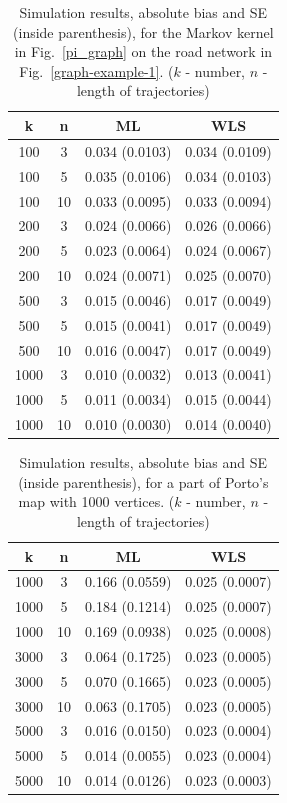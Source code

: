 \documentclass[b5paper,12pt]{report}
\theoremstyle{definition}
\begin{document}
\begin{table}[!b]
\centering
\caption{Simulation results, absolute bias and SE (inside parenthesis), for the Markov kernel in Fig.~\ref{pi_graph} on the road network in Fig.~\ref{graph-example-1}. ($k$ - number, $n$ - length of trajectories)}
\label{simulation_small} 
\begin{tabular}{c c | c c}
k & n & ML & WLS  \\ \hline
100 & 3 & 0.034 (0.0103) & 0.034 (0.0109)\\ 
100 & 5 & 0.035 (0.0106) & 0.034 (0.0103)\\ 
100 & 10 & 0.033 (0.0095) & 0.033 (0.0094)\\ 
200 & 3 & 0.024 (0.0066) & 0.026 (0.0066)\\ 
200 & 5 & 0.023 (0.0064) & 0.024 (0.0067)\\ 
200 & 10 & 0.024 (0.0071) & 0.025 (0.0070)\\ 
500 & 3 & 0.015 (0.0046) & 0.017 (0.0049)\\
500 & 5 & 0.015 (0.0041) & 0.017 (0.0049)\\
500 & 10 & 0.016 (0.0047) & 0.017 (0.0049)\\
1000 & 3 & 0.010 (0.0032) & 0.013 (0.0041)\\
1000 & 5 & 0.011 (0.0034) & 0.015 (0.0044)\\
1000 & 10 & 0.010 (0.0030) & 0.014 (0.0040)
\\
\hline
\end{tabular}
\end{table}

\begin{table}[!h]
\centering
\caption{Simulation results, absolute bias and SE (inside parenthesis), for a part of Porto's map with 1000 vertices. ($k$ - number, $n$ - length of trajectories)}
\label{simulation_large} 
\begin{tabular}{c c | c c}
k & n & ML & WLS  \\ \hline
1000 & 3 & 0.166 (0.0559) & 0.025 (0.0007) \\
1000 & 5 & 0.184 (0.1214) & 0.025 (0.0007) \\
1000 & 10 & 0.169 (0.0938) & 0.025 (0.0008) \\
3000 & 3 & 0.064 (0.1725) & 0.023 (0.0005) \\
3000 & 5 & 0.070 (0.1665) & 0.023 (0.0005) \\
3000 & 10 & 0.063 (0.1705) & 0.023 (0.0005) \\
5000 & 3 & 0.016 (0.0150) & 0.023 (0.0004) \\
5000 & 5 & 0.014 (0.0055) & 0.023 (0.0004) \\
5000 & 10 & 0.014 (0.0126) & 0.023 (0.0003) \\
\hline
\end{tabular}
\end{table}
\end{document}
